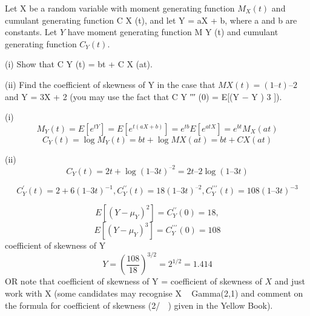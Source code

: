 \documentclass[a4paper,12pt]{article}
\begin{document}
 Let X be a random variable with moment generating function $M_X (t)$ and cumulant generating function C X (t), and let Y = aX + b, where a and b are constants. Let $Y$ have moment generating function M Y (t) and cumulant generating function $C_Y (t)$.
\item (i) Show that C Y (t) = bt + C X (at).
\item (ii) Find the coefficient of skewness of Y in the case that $M X (t) = (1 – t) –2$ and
Y = 3X + 2 (you may use the fact that C Y ′′′ (0) = E[(Y − \mu  Y ) 3 ]).



\item (i)
\[M_{Y} (t) = E[e^{tY} ] = E[e^{t(aX+b)}] = e^{tb}E[e^{atX} ] = e^{bt}M_X (at)\]
\[C_Y (t) = \log M_{Y} (t) = bt + \log MX (at) = bt + CX (at)\]
\item (ii)
\[C_Y (t) = 2t + \log(1 – 3t)^{ –2} = 2t – 2\log(1 – 3t) \]

\[C_Y^{\prime} (t) = 2 + 6(1 – 3t)^{-1} , C_Y^{\prime \prime} (t) = 18(1 – 3t)^{ –2} , C_Y^{\prime \prime \prime} (t) = 108(1 – 3t)^{-3}\]


\[E[(Y - \mu_Y )^2] = C_Y^{\prime \prime }(0) = 18, \]
\[E[(Y - \mu_Y )^3] = C_Y^{\prime \prime \prime}(0) = 108\]
coefficient of skewness of Y 
\[Y = \left( \frac{108}{18} \right)^{3/2} = 2^{1/2} = 1.414\]
OR note that coefficient of skewness of Y = coefficient of skewness of $X$ and just work with X (some candidates may recognise X ~ Gamma(2,1) and
comment on the formula for coefficient of skewness (2/  ) given in the
Yellow Book).
\end{document}
